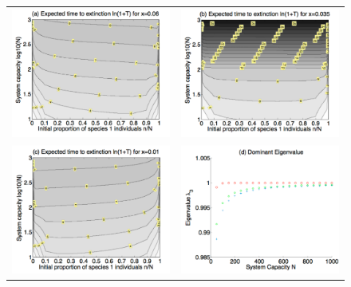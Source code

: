 \begin{figure}[th]
\centering
   \begin{tabular}{rr}
  \includegraphics[width=2.5in]{x06resize.pdf} & \includegraphics[width=2.5in]{x035resize.pdf} \\
  \includegraphics[width=2.5in]{x01resize.pdf} & \includegraphics[width=2.5in]{domevalresize.pdf} \end{tabular}

\end{figure}
